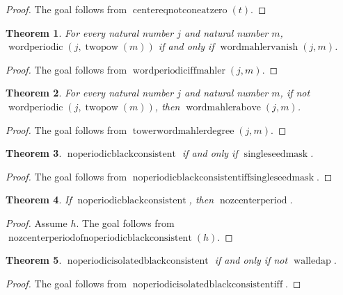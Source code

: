 \documentclass[11pt]{article}
\newtheorem{theorem}{Theorem}[section]
\theoremstyle{definition}
\begin{document}
\begin{proof}
The goal follows from \(\operatorname{centereqnotconeatzero}(t)\).
\end{proof}
\begin{theorem}
\label{ll:observations:word-periodic-iff-mahler}
For every natural number \(j\) and natural number \(m\), \(\operatorname{wordperiodic}(j, \operatorname{twopow}(m))\) if and only if \(\operatorname{wordmahlervanish}(j, m)\).
\end{theorem}
\begin{proof}
The goal follows from \(\operatorname{wordperiodiciffmahler}(j, m)\).
\end{proof}
\begin{theorem}
\label{ll:observations:tower-word-mahler-degree}
For every natural number \(j\) and natural number \(m\), if not \(\operatorname{wordperiodic}(j, \operatorname{twopow}(m))\), then \(\operatorname{wordmahlerabove}(j, m)\).
\end{theorem}
\begin{proof}
The goal follows from \(\operatorname{towerwordmahlerdegree}(j, m)\).
\end{proof}
\begin{theorem}
\label{ll:observations:no-periodic-black-consistent-iff-single-seed-mask}
\(\operatorname{noperiodicblackconsistent}\) if and only if \(\operatorname{singleseedmask}\).
\end{theorem}
\begin{proof}
The goal follows from \(\operatorname{noperiodicblackconsistentiffsingleseedmask}\).
\end{proof}
\begin{theorem}
\label{ll:observations:no-zcenter-period-of-no-periodic-black-consistent}
If \(\operatorname{noperiodicblackconsistent}\), then \(\operatorname{nozcenterperiod}\).
\end{theorem}
\begin{proof}
Assume \(h\).
The goal follows from \(\operatorname{nozcenterperiodofnoperiodicblackconsistent}(h)\).
\end{proof}
\begin{theorem}
\label{ll:observations:no-periodic-isolated-black-consistent-iff}
\(\operatorname{noperiodicisolatedblackconsistent}\) if and only if not \(\operatorname{walledap}\).
\end{theorem}
\begin{proof}
The goal follows from \(\operatorname{noperiodicisolatedblackconsistentiff}\).
\end{proof}
\end{document}
